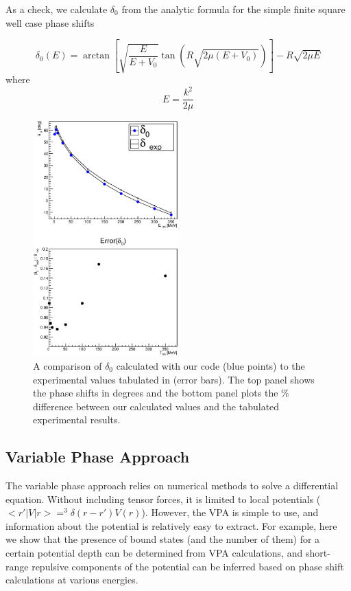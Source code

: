 \documentclass[10pt,showpacs,preprintnumbers,footinbib,amsmath,amssymb,aps,prl,twocolumn,groupedaddress,superscriptaddress,showkeys]{revtex4-1}
\begin{document}
As a check, we calculate
$\delta _0$ from the analytic formula for the simple finite square well case phase shifts

\begin{equation}
	\delta _0(E) = \arctan \left [ \sqrt{\frac{E}{E+V_0}} \tan \left ( R \sqrt{2 \mu (E + V_0)}
 \right ) \right ] - R \sqrt{2 \mu E}
	\label{eq:deltaAnalytic}
\end{equation}
where
\begin{equation*}
	E = \frac{k^2}{2 \mu}
\end{equation*}

\begin{figure}
\centering
	\includegraphics[width=0.5\textwidth]{figures/phy989_NPexp.eps}
	\caption{A comparison of $\delta _0$ calculated with our code
	(blue points) to the experimental values tabulated in \citep{Nijmegen} (error
	bars). The top panel shows the phase shifts in degrees and the bottom panel
	plots the \% difference between our calculated values and the tabulated
	experimental results.}
	\label{fig:NPexp}
\end{figure}


\subsection{Variable Phase Approach}
The variable phase approach relies on numerical methods to solve a differential equation.
Without including tensor forces,
it is limited to local potentials ($<r'|V|r>=^3\delta(r-r')V(r)$). However, the VPA is simple to use,
and information about the potential is relatively easy to extract. For example, here we show
that the presence of bound states (and the number of them) for a certain potential depth can
be determined from VPA calculations, and short-range repulsive components of the potential can
be inferred based on phase shift calculations at various energies.
\end{document}
